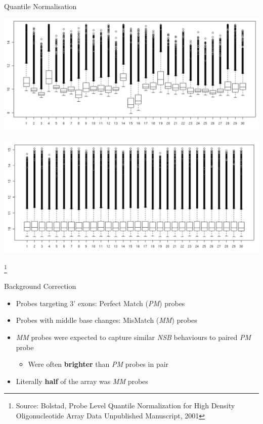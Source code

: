 \documentclass[aspectratio=169,11pt]{beamer}
\newcommand\blfootnote[1]{%
  \begingroup
  \renewcommand\thefootnote{}\footnote{#1}%
  \addtocounter{footnote}{-1}%
  \endgroup
}
\begin{document}
\begin{frame}{Quantile Normalisation}

	\begin{center}
		\includegraphics[scale=0.17]{figures/preNorm.png} 
		~\\
		\includegraphics[scale=0.17]{figures/postNorm.png} 
	\end{center}

\blfootnote{Source: Bolstad, Probe Level Quantile Normalization for High Density Oligonucleotide Array Data Unpublished Manuscript, 2001}	

\end{frame}



\begin{frame}{Background Correction}

	\begin{itemize}
		\item Probes targeting 3' exons: Perfect Match (\textit{PM}) probes
		\item Probes with middle base changes: MisMatch (\textit{MM}) probes
		\item \textit{MM} probes were expected to capture similar \textit{NSB} behaviours to paired \textit{PM} probe
		\begin{itemize}
			\item Were often \textbf{brighter} than \textit{PM} probes in pair
		\end{itemize}
		\item Literally \textbf{half} of the array was \textit{MM} probes
	\end{itemize}
	
\end{frame}
\end{document}

